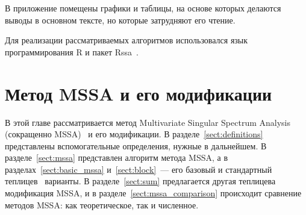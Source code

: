 \documentclass[specialist,
substylefile = spbu.rtx,
               subf,href,colorlinks=true, 12pt]{disser}
\theoremstyle{definition}
\begin{document}
В приложение помещены графики и таблицы, на основе которых делаются выводы в основном тексте, но которые затрудняют его чтение.

Для реализации рассматриваемых алгоритмов использовался язык программирования \textsf{R} и пакет \textsf{Rssa}~\cite{Rssa}.

\chapter{Метод MSSA и его модификации}\label{chpt:mssa}
В этой главе рассматривается метод Multivariate Singular Spectrum Analysis (сокращенно MSSA)~\cite{Golyandina2015} и его модификации. В разделе~\ref{sect:definitions} представлены вспомогательные определения, нужные в дальнейшем. В разделе~\ref{sect:mssa} представлен алгоритм метода MSSA, а в разделах~\ref{sect:basic_mssa} и~\ref{sect:block}~--- его базовый и стандартный теплицев~\cite{Plaut1994} варианты. В разделе~\ref{sect:sum} предлагается другая теплицева модификация MSSA, и в разделе~\ref{sect:mssa_comparison} происходит сравнение методов MSSA: как теоретическое, так и численное.
\end{document}
